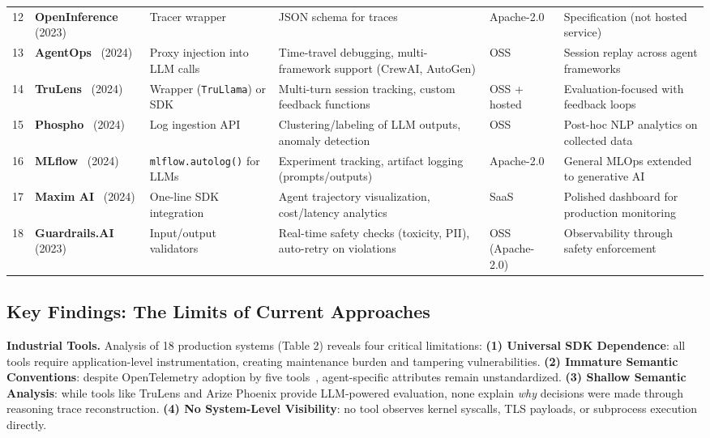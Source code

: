 \documentclass[sigplan,screen,9pt]{acmart}
\begin{document}
\begin{table*}[t]
\begin{tabular}{p{0.5cm} p{2.2cm} p{2.3cm} p{2.8cm} p{1.8cm} p{2.5cm}}
12 & \textbf{OpenInference}~\cite{openinference} (2023) & Tracer wrapper & JSON schema for traces & Apache-2.0 & Specification (not hosted service) \\
13 & \textbf{AgentOps}~\cite{agentops-tool} (2024) & Proxy injection into LLM calls & Time-travel debugging, multi-framework support (CrewAI, AutoGen) & OSS & Session replay across agent frameworks \\
14 & \textbf{TruLens}~\cite{trulens} (2024) & Wrapper (\texttt{TruLlama}) or SDK & Multi-turn session tracking, custom feedback functions & OSS + hosted & Evaluation-focused with feedback loops \\
15 & \textbf{Phospho}~\cite{phospho} (2024) & Log ingestion API & Clustering/labeling of LLM outputs, anomaly detection & OSS & Post-hoc NLP analytics on collected data \\
16 & \textbf{MLflow}~\cite{mlflow-genai} (2024) & \texttt{mlflow.autolog()} for LLMs & Experiment tracking, artifact logging (prompts/outputs) & Apache-2.0 & General MLOps extended to generative AI \\
17 & \textbf{Maxim AI}~\cite{maxim-ai} (2024) & One-line SDK integration & Agent trajectory visualization, cost/latency analytics & SaaS & Polished dashboard for production monitoring \\
18 & \textbf{Guardrails.AI}~\cite{guardrails-ai} (2023) & Input/output validators & Real-time safety checks (toxicity, PII), auto-retry on violations & OSS (Apache-2.0) & Observability through safety enforcement \\
\bottomrule
\end{tabular}
\end{table*}

\subsection{Key Findings: The Limits of Current Approaches}

\textbf{Industrial Tools.} Analysis of 18 production systems (Table 2) reveals four critical limitations: \textbf{(1) Universal SDK Dependence}: all tools require application-level instrumentation, creating maintenance burden and tampering vulnerabilities. \textbf{(2) Immature Semantic Conventions}: despite OpenTelemetry adoption by five tools~\cite{Liu2025OTel}, agent-specific attributes remain unstandardized. \textbf{(3) Shallow Semantic Analysis}: while tools like TruLens and Arize Phoenix provide LLM-powered evaluation, none explain \emph{why} decisions were made through reasoning trace reconstruction. \textbf{(4) No System-Level Visibility}: no tool observes kernel syscalls, TLS payloads, or subprocess execution directly.
\end{document}
